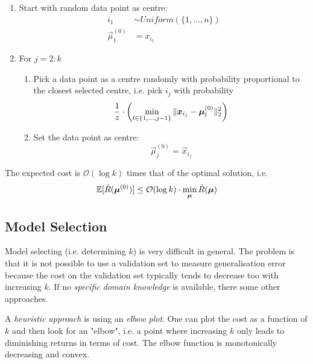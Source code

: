 \begin{enumerate}
    \item Start with random data point as centre:
    \begin{align*}
        i_1 &\sim Uniform(\{1, \dotsc, n\}) \\
        \vec{\mu}_1^{(0)} &= x_{i_1}
    \end{align*}
    
    \item For $j = 2 : k$
    \begin{enumerate}
        \item Pick a data point as a centre randomly
        with probability proportional to the closest
        selected centre, i.e. pick $i_j$ with probability
        \begin{equation*}
            \frac{1}{z} \cdot \left(
                \min_{l \in \{1, \dotsc, j - 1\}}{
                    \lVert\boldsymbol{x}_{i_j} - \boldsymbol{\mu}_l^{(0)}\rVert_2^2
                }
            \right)
        \end{equation*}
        \item Set the data point as centre:
        \begin{equation*}
            \vec{\mu}_j^{(0)} = \vec{x}_{i_j}
        \end{equation*}
    \end{enumerate}
\end{enumerate}

The expected cost is $\mathcal{O}(\log k)$ times that
of the optimal solution, i.e.
\begin{equation*}
    \mathbb{E}[\hat{R}(\boldsymbol{\mu}^{(0)})]
    \leq \mathcal{O}(\log k) \cdot \min_{\boldsymbol{\mu}}{\hat{R}(\boldsymbol{\mu})}
\end{equation*}


\subsection{Model Selection}
Model selecting (i.e. determining $k$)
is very difficult in general.
The problem is that it is not possible to use a validation
set to measure generalisation error because
the cost on the validation set typically tends to decrease
too with increasing $k$.
If no \emph{specific domain knowledge} is available,
there some other approaches.

A \emph{heuristic approach} is using an \emph{elbow plot}.
One can plot the cost as a function of $k$ and then
look for an "elbow",
i.e. a point where increasing $k$ only leads to
diminishing returns in terms of cost.
The elbow function is monotonically decreasing and convex.

